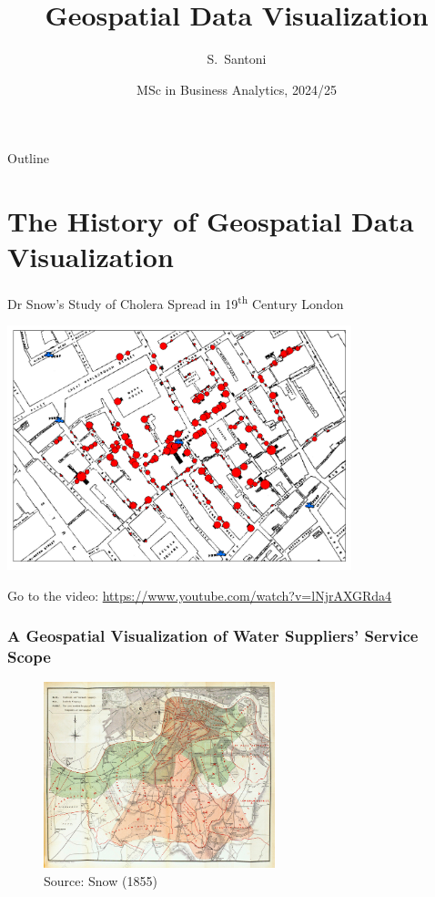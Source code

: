\documentclass[show notes, aspectratio=1610]{beamer}
\title{Geospatial Data Visualization}
\author{S.~Santoni\inst{1}}
\institute{
	\inst{1}%
	Bayes Business School
	}
\date{MSc in Business Analytics, 2024/25}
\begin{document}
\begin{frame}
	\titlepage
\end{frame}

\begin{frame}{Outline}
	\tableofcontents
\end{frame}

\section{The History of Geospatial Data Visualization}

\begin{frame}{Dr Snow's Study of Cholera Spread in 19\textsuperscript{th}
		Century London}{}

	\centering

	\includegraphics[width=0.75\textwidth]{images/SnowMap_Points.png}

	Go to the video: \url{https://www.youtube.com/watch?v=lNjrAXGRda4}
\end{frame}

\begin{frame}
	\frametitle{A Geospatial Visualization of Water Suppliers' Service Scope}
	\begin{figure}
		\begin{center}
			\includegraphics[width=0.6\textwidth]{images/water_supply.jpg}
		\end{center}
		\caption*{Source: Snow (1855)}\label{fig:water_supply}
	\end{figure}
\end{frame}
\end{document}
